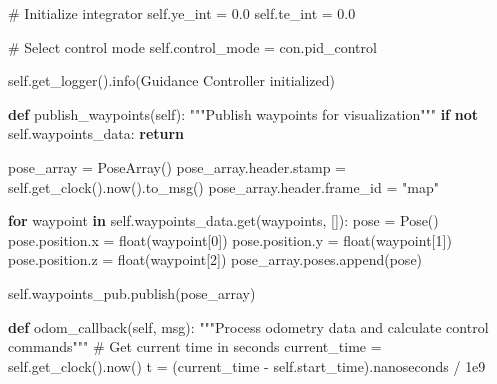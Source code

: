\documentclass[
  letterpaper,
  DIV=11,
  numbers=noendperiod]{scrreprt}
\newenvironment{Shaded}{\begin{snugshade}}{\end{snugshade}}
\newcommand{\BuiltInTok}[1]{\textcolor[rgb]{0.00,0.23,0.31}{#1}}
\newcommand{\CommentTok}[1]{\textcolor[rgb]{0.37,0.37,0.37}{#1}}
\newcommand{\ControlFlowTok}[1]{\textcolor[rgb]{0.00,0.23,0.31}{\textbf{#1}}}
\newcommand{\DecValTok}[1]{\textcolor[rgb]{0.68,0.00,0.00}{#1}}
\newcommand{\FloatTok}[1]{\textcolor[rgb]{0.68,0.00,0.00}{#1}}
\newcommand{\KeywordTok}[1]{\textcolor[rgb]{0.00,0.23,0.31}{\textbf{#1}}}
\newcommand{\NormalTok}[1]{\textcolor[rgb]{0.00,0.23,0.31}{#1}}
\newcommand{\OperatorTok}[1]{\textcolor[rgb]{0.37,0.37,0.37}{#1}}
\newcommand{\StringTok}[1]{\textcolor[rgb]{0.13,0.47,0.30}{#1}}
\newcommand{\VariableTok}[1]{\textcolor[rgb]{0.07,0.07,0.07}{#1}}
\begin{document}
\begin{Shaded}
\begin{Highlighting}[]
        \CommentTok{\# Initialize integrator}
        \VariableTok{self}\NormalTok{.ye\_int }\OperatorTok{=} \FloatTok{0.0}
        \VariableTok{self}\NormalTok{.te\_int }\OperatorTok{=} \FloatTok{0.0}
        
        \CommentTok{\# Select control mode}
        \VariableTok{self}\NormalTok{.control\_mode }\OperatorTok{=}\NormalTok{ con.pid\_control}
        
        \VariableTok{self}\NormalTok{.get\_logger().info(}\StringTok{\textquotesingle{}Guidance Controller initialized\textquotesingle{}}\NormalTok{)}

    \KeywordTok{def}\NormalTok{ publish\_waypoints(}\VariableTok{self}\NormalTok{):}
        \CommentTok{"""Publish waypoints for visualization"""}
        \ControlFlowTok{if} \KeywordTok{not} \VariableTok{self}\NormalTok{.waypoints\_data:}
            \ControlFlowTok{return}
            
\NormalTok{        pose\_array }\OperatorTok{=}\NormalTok{ PoseArray()}
\NormalTok{        pose\_array.header.stamp }\OperatorTok{=} \VariableTok{self}\NormalTok{.get\_clock().now().to\_msg()}
\NormalTok{        pose\_array.header.frame\_id }\OperatorTok{=} \StringTok{"map"}
        
        \ControlFlowTok{for}\NormalTok{ waypoint }\KeywordTok{in} \VariableTok{self}\NormalTok{.waypoints\_data.get(}\StringTok{\textquotesingle{}waypoints\textquotesingle{}}\NormalTok{, []):}
\NormalTok{            pose }\OperatorTok{=}\NormalTok{ Pose()}
\NormalTok{            pose.position.x }\OperatorTok{=} \BuiltInTok{float}\NormalTok{(waypoint[}\DecValTok{0}\NormalTok{])}
\NormalTok{            pose.position.y }\OperatorTok{=} \BuiltInTok{float}\NormalTok{(waypoint[}\DecValTok{1}\NormalTok{])}
\NormalTok{            pose.position.z }\OperatorTok{=} \BuiltInTok{float}\NormalTok{(waypoint[}\DecValTok{2}\NormalTok{])}
\NormalTok{            pose\_array.poses.append(pose)}
        
        \VariableTok{self}\NormalTok{.waypoints\_pub.publish(pose\_array)}
    
    \KeywordTok{def}\NormalTok{ odom\_callback(}\VariableTok{self}\NormalTok{, msg):}
        \CommentTok{"""Process odometry data and calculate control commands"""}
        \CommentTok{\# Get current time in seconds}
\NormalTok{        current\_time }\OperatorTok{=} \VariableTok{self}\NormalTok{.get\_clock().now()}
\NormalTok{        t }\OperatorTok{=}\NormalTok{ (current\_time }\OperatorTok{{-}} \VariableTok{self}\NormalTok{.start\_time).nanoseconds }\OperatorTok{/} \FloatTok{1e9}


\end{Highlighting}
\end{Shaded}
\end{document}
